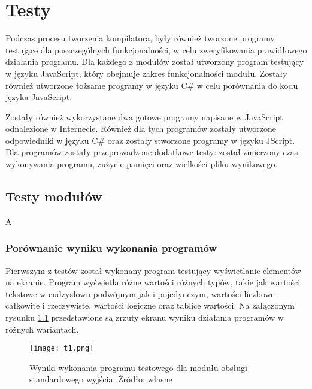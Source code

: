 \chapter{Testy}
\label{rozdzial4}

\par Podczas procesu tworzenia kompilatora, były również tworzone programy testujące dla poszczególnych funkcjonalności, w celu zweryfikowania prawidłowego działania programu. Dla każdego z modułów został utworzony program testujący w języku JavaScript, który obejmuje zakres funkcjonalności modułu. Zostały również utworzone tożsame programy w języku C\# w celu porównania do kodu języka JavaScript.
\par Zostały również wykorzystane dwa gotowe programy napisane w JavaScript odnalezione w Internecie. Również dla tych programów zostały utworzone odpowiedniki w języku C\# oraz zostały stworzone programy w języku JScript. Dla programów zostały przeprowadzone dodatkowe testy: został zmierzony czas wykonywania programu, zużycie pamięci oraz wielkości pliku wynikowego.

\section{Testy modułów}

\par A

\subsection{Porównanie wyniku wykonania programów}

\par Pierwszym z testów został wykonany program testujący wyświetlanie elementów na ekranie. Program wyświetla różne wartości różnych typów, takie jak wartości tekstowe w cudzysłowu podwójnym jak i pojedynczym, wartości liczbowe całkowite i rzeczywiste, wartości logiczne oraz tablice wartości. Na załączonym rysunku \ref{fig:result1} przedstawione są zrzuty ekranu wyniku działania programów w różnych wariantach.

\begin{figure}[!h]
	\centering
  \texttt{[image: t1.png]}
	\caption{Wyniki wykonania programu testowego dla modułu obsługi standardowego wyjścia. Źródło: własne}
	\label{fig:result1}
\end{figure}

